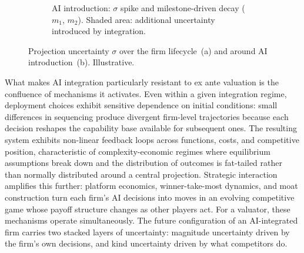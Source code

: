 \documentclass[oneside,10pt]{swissi}
\begin{document}
\begin{figure}[htbp]
\begin{subfigure}[t]{0.48\textwidth}
\caption{AI introduction: $\sigma$ spike and milestone-driven decay ($m_1$, $m_2$). Shaded area: additional uncertainty introduced by integration.}
\label{fig:dcf-panel-b}
\end{subfigure}
\caption{Projection uncertainty $\sigma$ over the firm lifecycle~(a) and around AI introduction~(b). Illustrative.}
\label{fig:dcf-uncertainty}
\end{figure}

What makes AI integration particularly resistant to ex ante valuation is the confluence of mechanisms it activates. Even within a given integration regime, deployment choices exhibit sensitive dependence on initial conditions: small differences in sequencing produce divergent firm-level trajectories because each decision reshapes the capability base available for subsequent ones.\cite{lorenz1963chaos} The resulting system exhibits non-linear feedback loops across functions, costs, and competitive position, characteristic of complexity-economic regimes where equilibrium assumptions break down and the distribution of outcomes is fat-tailed rather than normally distributed around a central projection.\cite{arthur2021complexity} Strategic interaction amplifies this further: platform economics, winner-take-most dynamics, and moat construction turn each firm's AI decisions into moves in an evolving competitive game whose payoff structure changes as other players act.\cite{vonneumann1944games,rochet2003platform} For a valuator, these mechanisms operate simultaneously. The future configuration of an AI-integrated firm carries two stacked layers of uncertainty: magnitude uncertainty driven by the firm's own decisions, and kind uncertainty driven by what competitors do.
\end{document}
